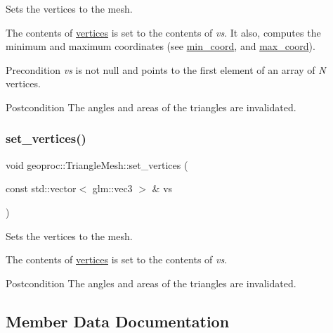 Sets the vertices to the mesh. 

The contents of \hyperlink{classgeoproc_1_1TriangleMesh_a82c3351de37daa9440f53597f080992d}{vertices} is set to the contents of {\itshape vs}. It also, computes the minimum and maximum coordinates (see \hyperlink{classgeoproc_1_1TriangleMesh_aab5e7d8baf6f6cd7b5655b4c89f79e00}{min\+\_\+coord}, and \hyperlink{classgeoproc_1_1TriangleMesh_acffb17b164f0428aa01316b0a08bc2a3}{max\+\_\+coord}). \begin{DoxyPrecond}{Precondition}
{\itshape vs} is not null and points to the first element of an array of {\itshape N} vertices.
\end{DoxyPrecond}
\begin{DoxyPostcond}{Postcondition}
The angles and areas of the triangles are invalidated. 
\end{DoxyPostcond}
\mbox{\label{classgeoproc_1_1TriangleMesh_a2bd9a343db1642d11b39b6fab5710d3a}} 
\subsubsection{\texorpdfstring{set\+\_\+vertices()}{set\_vertices()}\hspace{0.1cm}{\footnotesize\ttfamily [3/3]}}
{\footnotesize\ttfamily void geoproc\+::\+Triangle\+Mesh\+::set\+\_\+vertices (\begin{DoxyParamCaption}\item[{const std\+::vector$<$ glm\+::vec3 $>$ \&}]{vs }\end{DoxyParamCaption})}



Sets the vertices to the mesh. 

The contents of \hyperlink{classgeoproc_1_1TriangleMesh_a82c3351de37daa9440f53597f080992d}{vertices} is set to the contents of {\itshape vs}.

\begin{DoxyPostcond}{Postcondition}
The angles and areas of the triangles are invalidated. 
\end{DoxyPostcond}


\subsection{Member Data Documentation}
\mbox{\label{classgeoproc_1_1TriangleMesh_ab10f052ad932cd78056a55b58ddd475c}} 
